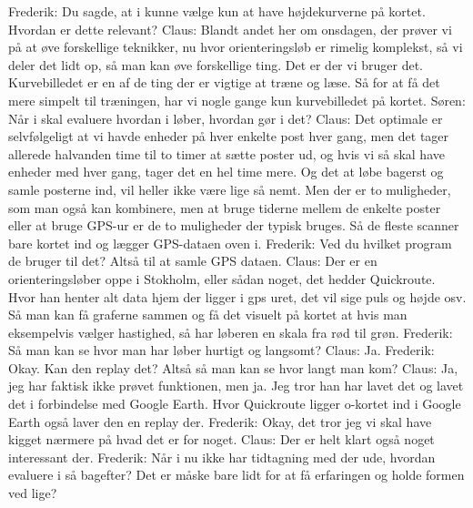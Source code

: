 Frederik: Du sagde, at i kunne vælge kun at have højdekurverne på kortet. Hvordan er dette relevant?\newline
Claus: Blandt andet her om onsdagen, der prøver vi på at øve forskellige teknikker, nu hvor orienteringsløb er rimelig komplekst, så vi deler det lidt op, så man kan øve forskellige ting. Det er der vi bruger det. Kurvebilledet er en af de ting der er vigtige at træne og læse. Så for at få det mere simpelt til træningen, har vi nogle gange kun kurvebilledet på kortet.\newline
Søren: Når i skal evaluere hvordan i løber, hvordan gør i det?\newline
Claus: Det optimale er selvfølgeligt at vi havde enheder på hver enkelte post hver gang, men det tager allerede halvanden time til to timer at sætte poster ud, og hvis vi så skal have enheder med hver gang, tager det en hel time mere. Og det at løbe bagerst og samle posterne ind, vil heller ikke være lige så nemt. Men der er to muligheder, som man også kan kombinere, men at bruge tiderne mellem de enkelte poster eller at bruge GPS-ur er de to muligheder der typisk bruges. Så de fleste scanner bare kortet ind og lægger GPS-dataen oven i.\newline
Frederik:  Ved du hvilket program de bruger til det? Altså til at samle GPS dataen.\newline
Claus: Der er en orienteringsløber oppe i Stokholm, eller sådan noget, det hedder Quickroute. Hvor han henter alt data hjem der ligger i gps uret, det vil sige puls og højde osv. Så man kan få graferne sammen og få det visuelt på kortet at hvis man eksempelvis vælger hastighed, så har løberen en skala fra rød til grøn.\newline
Frederik: Så man kan se hvor man har løber hurtigt og langsomt?\newline
Claus: Ja. \newline
Frederik: Okay. Kan den replay det? Altså så man kan se hvor langt man kom?\newline
Claus: Ja, jeg har faktisk ikke prøvet funktionen, men ja. Jeg tror han har lavet det og lavet det i forbindelse med Google Earth. Hvor Quickroute ligger o-kortet ind i Google Earth også laver den en replay der. \newline
Frederik: Okay, det tror jeg vi skal have kigget nærmere på hvad det er for noget. \newline
Claus: Der er helt klart også noget interessant der.\newline
Frederik: Når i nu ikke har tidtagning med der ude, hvordan evaluere i så bagefter? Det er måske bare lidt for at få erfaringen og holde formen ved lige?\newline
